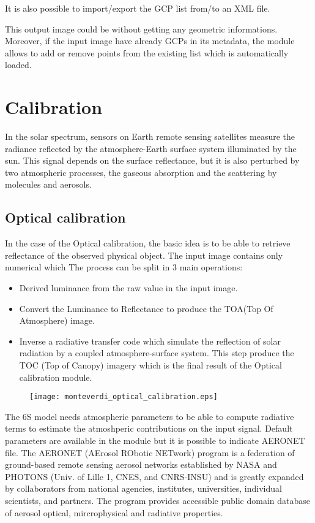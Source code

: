 \documentclass{InsightSoftwareGuide}
\begin{document}
It is also possible to import/export the GCP list from/to an XML file.

This output image could be without getting any geometric informations. Moreover, if the input image have already GCPs
in its metadata, the module allows to add or remove points from the existing list which is automatically loaded.       

\section{Calibration}
In the solar spectrum, sensors on Earth remote sensing satellites measure
the radiance reflected by the atmosphere-Earth surface system illuminated by the sun. This signal
depends on the surface reflectance, but it is also perturbed by two atmospheric processes, the
gaseous absorption and the scattering by molecules and aerosols.

   
\subsection{Optical calibration}
In the case of the Optical calibration, the basic idea is to be able to retrieve reflectance of the observed physical object.
The input image contains only numerical which 
The process can be split in 3 main operations:
\begin{itemize}
\item Derived luminance from the raw value in the input image. 
\item Convert the Luminance to Reflectance to produce the TOA(Top Of Atmosphere) image.
\item Inverse a radiative transfer code which simulate the reflection of solar radiation by a coupled atmosphere-surface system. This step produce 
the TOC (Top of Canopy) imagery which is the final result of the Optical calibration module. 
\end{itemize}
    
\begin{figure}
   \center
   \texttt{[image: monteverdi\_optical\_calibration.eps]}
   \label{fig:opticalcalibration}
\end{figure}

The 6S model needs atmospheric parameters to be able to compute radiative terms to estimate the atmoshperic contributions on the input
signal. Default parameters are available in the module but it is possible to indicate AERONET file. The AERONET 
(AErosol RObotic NETwork) program is a federation of ground-based remote sensing aerosol networks established by 
NASA and PHOTONS (Univ. of Lille 1, CNES, and CNRS-INSU) and is greatly expanded by collaborators from national 
agencies, institutes, universities, individual scientists, and partners. The program provides accessible public 
domain database of aerosol optical, mircrophysical and radiative properties.
\end{document}
